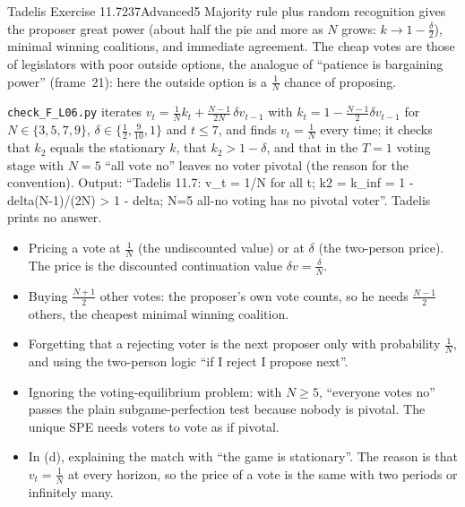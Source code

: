 \begin{exsol}{Tadelis Exercise 11.7}{237}{Advanced}{5}
\interp Majority rule plus random recognition gives the proposer great power (about half the pie and
more as $N$ grows: $k \to 1 - \frac{\delta}{2}$), minimal winning coalitions, and immediate agreement.
The cheap votes are those of legislators with poor outside options, the analogue of ``patience is
bargaining power'' (frame~21): here the outside option is a $\frac1N$ chance of proposing.

\verify \texttt{check\_F\_L06.py} iterates $v_t = \frac1N k_t + \frac{N-1}{2N}\,\delta v_{t-1}$ with
$k_t = 1 - \frac{N-1}{2}\delta v_{t-1}$ for $N \in \{3,5,7,9\}$, $\delta \in \{\frac12, \frac9{10}, 1\}$ and
$t \le 7$, and finds $v_t = \frac1N$ every time; it checks that $k_2$ equals the stationary $k$, that
$k_2 > 1 - \delta$, and that in the $T = 1$ voting stage with $N = 5$ ``all vote no'' leaves no voter
pivotal (the reason for the convention). Output: ``Tadelis 11.7: v\_t = 1/N for all t; k2 = k\_inf = 1 -
delta(N-1)/(2N) > 1 - delta; N=5 all-no voting has no pivotal voter''. Tadelis prints no answer.

\mistakes
\begin{itemize}
  \item Pricing a vote at $\frac1N$ (the undiscounted value) or at $\delta$ (the two-person price). The
  price is the discounted continuation value $\delta v = \frac{\delta}{N}$.
  \item Buying $\frac{N+1}{2}$ other votes: the proposer's own vote counts, so he needs $\frac{N-1}{2}$
  others, the cheapest minimal winning coalition.
  \item Forgetting that a rejecting voter is the next proposer only with probability $\frac1N$, and
  using the two-person logic ``if I reject I propose next''.
  \item Ignoring the voting-equilibrium problem: with $N \ge 5$, ``everyone votes no'' passes the plain
  subgame-perfection test because nobody is pivotal. The unique SPE needs voters to vote as if pivotal.
  \item In (d), explaining the match with ``the game is stationary''. The reason is that $v_t = \frac1N$ at
  every horizon, so the price of a vote is the same with two periods or infinitely many.
\end{itemize}

\end{exsol}
